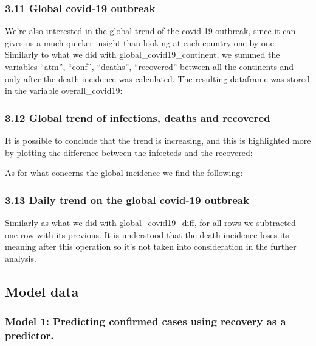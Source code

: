 \documentclass[11pt]{article}
\begin{document}
\hypertarget{global-covid-19-outbreak}{%
\subsubsection{3.11 Global covid-19
outbreak}\label{global-covid-19-outbreak}}

We're also interested in the global trend of the covid-19 outbreak,
since it can gives us a much quicker insight than looking at each
country one by one. Similarly to what we did with
global\_covid19\_continent, we summed the variables ``atm'', ``conf'',
``deaths'', ``recovered'' between all the continents and only after the
death incidence was calculated. The resulting dataframe was stored in
the variable overall\_covid19:

\hypertarget{global-trend-of-infections-deaths-and-recovered}{%
\subsubsection{3.12 Global trend of infections, deaths and
recovered}\label{global-trend-of-infections-deaths-and-recovered}}

It is possible to conclude that the trend is increasing, and this is
highlighted more by plotting the difference between the infecteds and
the recovered:

As for what concerns the global incidence we find the following:

\hypertarget{daily-trend-on-the-global-covid-19-outbreak}{%
\subsubsection{3.13 Daily trend on the global covid-19
outbreak}\label{daily-trend-on-the-global-covid-19-outbreak}}

Similarly as what we did with global\_covid19\_diff, for all rows we
subtracted one row with its previous. It is understood that the death
incidence loses its meaning after this operation so it's not taken into
consideration in the further analysis.

    \hypertarget{model-data}{%
\subsection{Model data}\label{model-data}}

\hypertarget{model-1-predicting-confirmed-cases-using-recovery-as-a-predictor.}{%
\subsubsection{Model 1: Predicting confirmed cases using recovery as a
predictor.}\label{model-1-predicting-confirmed-cases-using-recovery-as-a-predictor.}}
\end{document}
